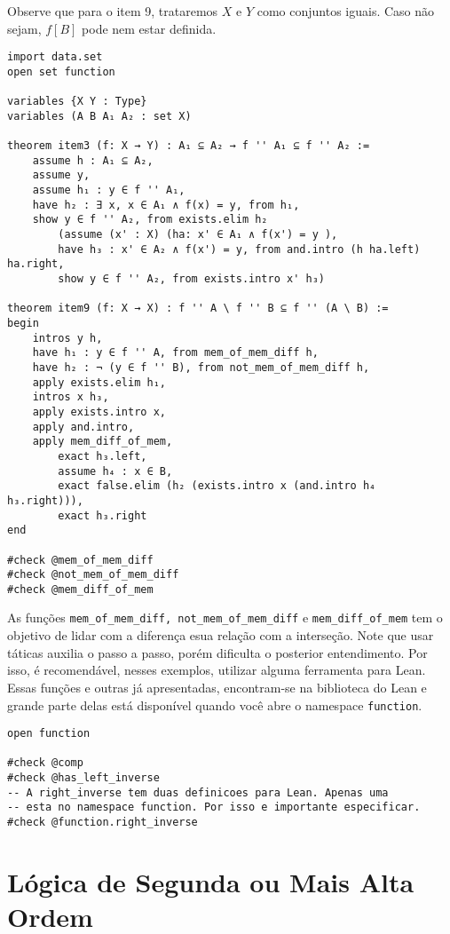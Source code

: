 Observe que para o item 9, trataremos $X$ e $Y$ como conjuntos iguais. Caso não sejam,
$f[B]$ pode nem estar definida.

\begin{lstlisting}
import data.set
open set function

variables {X Y : Type}
variables (A B A₁ A₂ : set X)

theorem item3 (f: X → Y) : A₁ ⊆ A₂ → f '' A₁ ⊆ f '' A₂ :=
    assume h : A₁ ⊆ A₂,
    assume y,
    assume h₁ : y ∈ f '' A₁,
    have h₂ : ∃ x, x ∈ A₁ ∧ f(x) = y, from h₁,
    show y ∈ f '' A₂, from exists.elim h₂
        (assume (x' : X) (ha: x' ∈ A₁ ∧ f(x') = y ),
        have h₃ : x' ∈ A₂ ∧ f(x') = y, from and.intro (h ha.left)  ha.right,
        show y ∈ f '' A₂, from exists.intro x' h₃)

theorem item9 (f: X → X) : f '' A \ f '' B ⊆ f '' (A \ B) :=
begin
    intros y h,
    have h₁ : y ∈ f '' A, from mem_of_mem_diff h,
    have h₂ : ¬ (y ∈ f '' B), from not_mem_of_mem_diff h,
    apply exists.elim h₁,
    intros x h₃,
    apply exists.intro x,
    apply and.intro,
    apply mem_diff_of_mem,
        exact h₃.left,
        assume h₄ : x ∈ B,
        exact false.elim (h₂ (exists.intro x (and.intro h₄ h₃.right))),
        exact h₃.right
end

#check @mem_of_mem_diff
#check @not_mem_of_mem_diff
#check @mem_diff_of_mem

\end{lstlisting}

As funções \lstinline{mem_of_mem_diff, not_mem_of_mem_diff} e \lstinline{mem_diff_of_mem}
tem o objetivo de lidar com a diferença esua relação com a interseção. Note que usar táticas
auxilia o passo a passo, porém dificulta o posterior entendimento. Por isso, é recomendável,
nesses exemplos, utilizar alguma ferramenta para Lean. 
Essas funções e outras já apresentadas, encontram-se na biblioteca do Lean e grande parte delas está 
disponível quando você abre o namespace \lstinline{function}.

\begin{lstlisting}
open function 

#check @comp 
#check @has_left_inverse
-- A right_inverse tem duas definicoes para Lean. Apenas uma
-- esta no namespace function. Por isso e importante especificar. 
#check @function.right_inverse    
\end{lstlisting}

\section{Lógica de Segunda ou Mais Alta Ordem}

